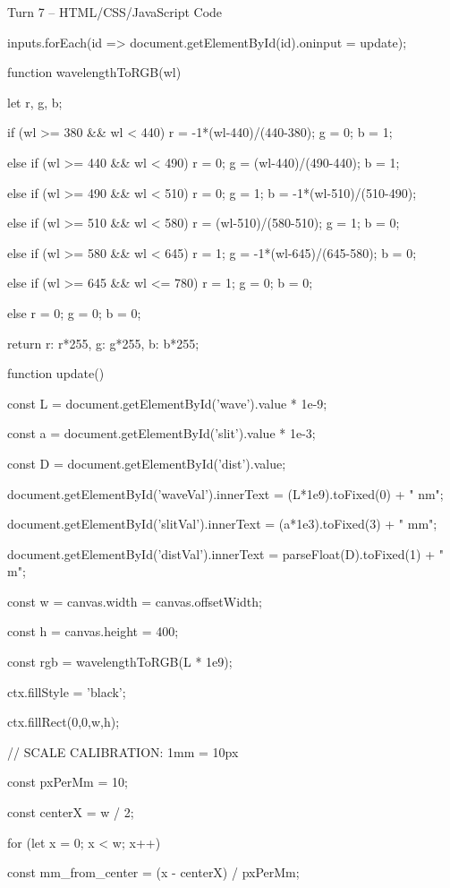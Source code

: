 \documentclass[10pt,a4paper]{article}
\begin{document}
\begin{htmlcodebox}{Turn 7 -- HTML/CSS/JavaScript Code}
{{{inputs.forEach(id => document.getElementById(id).oninput = update);

function wavelengthToRGB(wl) {

    let r, g, b;

    if (wl >= 380 && wl < 440) { r = -1*(wl-440)/(440-380); g = 0; b = 1; }

    else if (wl >= 440 && wl < 490) { r = 0; g = (wl-440)/(490-440); b = 1; }

    else if (wl >= 490 && wl < 510) { r = 0; g = 1; b = -1*(wl-510)/(510-490); }

    else if (wl >= 510 && wl < 580) { r = (wl-510)/(580-510); g = 1; b = 0; }

    else if (wl >= 580 && wl < 645) { r = 1; g = -1*(wl-645)/(645-580); b = 0; }

    else if (wl >= 645 && wl <= 780) { r = 1; g = 0; b = 0; }

    else { r = 0; g = 0; b = 0; }

    return {r: r*255, g: g*255, b: b*255};

}

function update() {

    const L = document.getElementById('wave').value * 1e-9;

    const a = document.getElementById('slit').value * 1e-3;

    const D = document.getElementById('dist').value;

    document.getElementById('waveVal').innerText = (L*1e9).toFixed(0) + " nm";


    document.getElementById('slitVal').innerText = (a*1e3).toFixed(3) + " mm";

    document.getElementById('distVal').innerText = parseFloat(D).toFixed(1) + " m";

    const w = canvas.width = canvas.offsetWidth;

    const h = canvas.height = 400;

    const rgb = wavelengthToRGB(L * 1e9);

    ctx.fillStyle = 'black';

    ctx.fillRect(0,0,w,h);

    // SCALE CALIBRATION: 1mm = 10px

    const pxPerMm = 10;

    const centerX = w / 2;

    for (let x = 0; x < w; x++) {

        const mm_from_center = (x - centerX) / pxPerMm;

}}}}}
\end{htmlcodebox}
\end{document}
